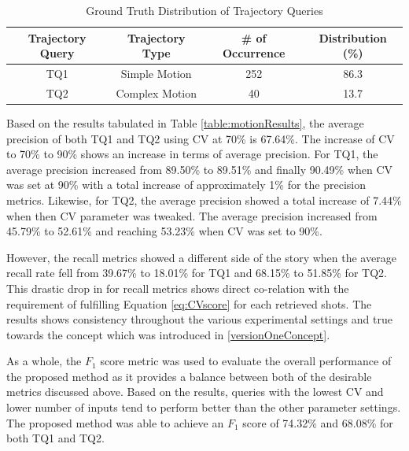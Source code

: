 \begin{table}[bht!]
\centering
\caption{Ground Truth Distribution of Trajectory Queries}
\label{table:motiondist}
\begin{tabular}{cccc}
\toprule
Trajectory Query &  Trajectory Type & \# of Occurrence & Distribution (\%)   \\
\midrule
TQ1       & Simple Motion       & 252 & 86.3   \\
TQ2      & Complex Motion       & 40 & 13.7  \\
\bottomrule
\end{tabular}
\end{table}

Based on the results tabulated in Table \ref{table:motionResults}, the average precision of both TQ1 and TQ2 using CV at 70\% is 67.64\%. The increase of CV to 70\% to 90\% shows an increase in terms of average precision. For TQ1, the average precision increased from 89.50\% to 89.51\% and finally 90.49\% when CV was set at 90\% with a total increase of approximately 1\% for the precision metrics. Likewise, for TQ2, the average precision showed a total increase of 7.44\% when then CV parameter was tweaked. The average precision increased from 45.79\% to 52.61\% and reaching 53.23\% when CV was set to 90\%.

However, the recall metrics showed a different side of the story when the average recall rate fell from 39.67\% to 18.01\% for TQ1 and 68.15\% to 51.85\% for TQ2. This drastic drop in for recall metrics shows direct co-relation with the requirement of fulfilling Equation \ref{eq:CVscore} for each retrieved shots. The results shows consistency throughout the various experimental settings and true towards the concept which was introduced in \ref{versionOneConcept}.

As a whole, the $F_1$ score metric was used to evaluate the overall performance of the proposed method as it provides a balance between both of the desirable metrics discussed above. Based on the results, queries with the lowest CV and lower number of inputs tend to perform better than the other parameter settings. The proposed method was able to achieve an $F_1$ score of 74.32\% and 68.08\% for both TQ1 and TQ2.


